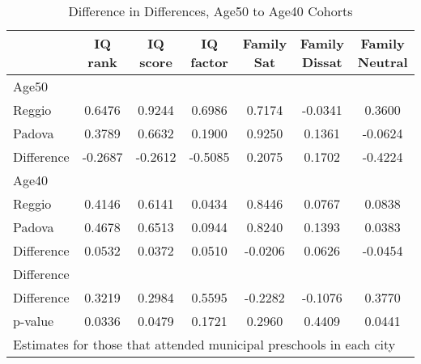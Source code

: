 \begin{table}[htbp]\centering
\caption{Difference in Differences, Age50 to Age40 Cohorts}
\begin{tabular}{l*{6}{c}}
\hline\hline
            &     IQ rank&    IQ score&   IQ factor&  Family Sat&Family Dissat&Family Neutral\\
\hline
Age50       &            &            &            &            &            &            \\
Reggio      &      0.6476&      0.9244&      0.6986&      0.7174&     -0.0341&      0.3600\\
Padova      &      0.3789&      0.6632&      0.1900&      0.9250&      0.1361&     -0.0624\\
Difference  &     -0.2687&     -0.2612&     -0.5085&      0.2075&      0.1702&     -0.4224\\
\hline
Age40       &            &            &            &            &            &            \\
Reggio      &      0.4146&      0.6141&      0.0434&      0.8446&      0.0767&      0.0838\\
Padova      &      0.4678&      0.6513&      0.0944&      0.8240&      0.1393&      0.0383\\
Difference  &      0.0532&      0.0372&      0.0510&     -0.0206&      0.0626&     -0.0454\\
\hline
Difference  &            &            &            &            &            &            \\
Difference  &      0.3219&      0.2984&      0.5595&     -0.2282&     -0.1076&      0.3770\\
p-value     &      0.0336&      0.0479&      0.1721&      0.2960&      0.4409&      0.0441\\
\hline\hline
\multicolumn{7}{l}{\footnotesize Estimates for those that attended municipal preschools in each city}\\
\end{tabular}
\end{table}
